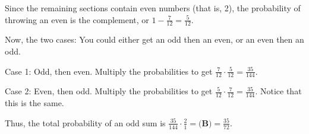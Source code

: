 \begin{enumerate}
 Since the remaining sections contain even numbers (that is, 2), the probability of throwing an even is the complement, or $1 - \frac{7}{12} = \frac{5}{12}$.

 
Now, the two cases: You could either get an odd then an even, or an even then an odd.

 
Case 1: Odd, then even. Multiply the probabilities to get $\frac{7}{12} \cdot \frac{5}{12} = \frac{35}{144}$.

 
Case 2: Even, then odd. Multiply the probabilities to get $\frac{5}{12} \cdot \frac{7}{12} = \frac{35}{144}$. Notice that this is the same.

 
Thus, the total probability of an odd sum is $\frac{35}{144} \cdot \frac{2}{1} = \boxed{\textbf{(B)} = \frac{35}{72}}$.

 


\end{enumerate}